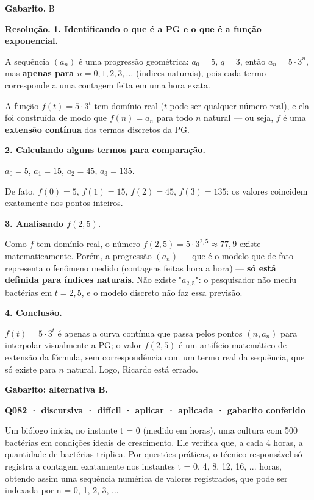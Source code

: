 \documentclass[11pt,a4paper]{article}
\begin{document}
\textbf{Gabarito.} B

\textbf{Resolução.} \textbf{1. Identificando o que é a PG e o que é a função exponencial.}

A sequência $(a_n)$ é uma progressão geométrica: $a_0=5$, $q=3$, então $a_n = 5\cdot 3^n$, mas \textbf{apenas para $n = 0,1,2,3,\ldots$} (índices naturais), pois cada termo corresponde a uma contagem feita em uma hora exata.

A função $f(t) = 5\cdot 3^t$ tem domínio real ($t$ pode ser qualquer número real), e ela foi construída de modo que $f(n) = a_n$ para todo $n$ natural — ou seja, $f$ é uma \textbf{extensão contínua} dos termos discretos da PG.

\textbf{2. Calculando alguns termos para comparação.}

$a_0 = 5$, $a_1 = 15$, $a_2 = 45$, $a_3 = 135$.

De fato, $f(0)=5$, $f(1)=15$, $f(2)=45$, $f(3)=135$: os valores coincidem exatamente nos pontos inteiros.

\textbf{3. Analisando $f(2{,}5)$.}

Como $f$ tem domínio real, o número $f(2{,}5)=5\cdot 3^{2,5}\approx 77{,}9$ existe matematicamente. Porém, a progressão $(a_n)$ — que é o modelo que de fato representa o fenômeno medido (contagens feitas hora a hora) — \textbf{só está definida para índices naturais}. Não existe "$a_{2,5}$": o pesquisador não mediu bactérias em $t=2{,}5$, e o modelo discreto não faz essa previsão.

\textbf{4. Conclusão.}

$f(t)=5\cdot3^t$ é apenas a curva contínua que passa pelos pontos $(n, a_n)$ para interpolar visualmente a PG; o valor $f(2{,}5)$ é um artifício matemático de extensão da fórmula, sem correspondência com um termo real da sequência, que só existe para $n$ natural. Logo, Ricardo está errado.

\textbf{Gabarito: alternativa B.}

\bigskip\noindent\textbf{Q082 · discursiva · difícil · aplicar · aplicada · gabarito conferido}\par\nopagebreak
Um biólogo inicia, no instante t = 0 (medido em horas), uma cultura com 500 bactérias em condições ideais de crescimento. Ele verifica que, a cada 4 horas, a quantidade de bactérias triplica. Por questões práticas, o técnico responsável só registra a contagem exatamente nos instantes t = 0, 4, 8, 12, 16, ... horas, obtendo assim uma sequência numérica de valores registrados, que pode ser indexada por n = 0, 1, 2, 3, ...
\end{document}
